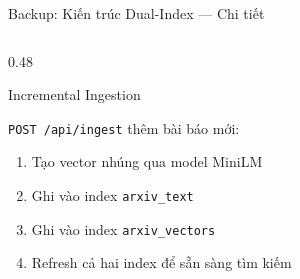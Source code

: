 \begin{frame}{Backup: Kiến trúc Dual-Index --- Chi tiết}
\begin{columns}[T]
\begin{column}{0.48\textwidth}
\vspace{-0.1cm}

\begin{block}{Incremental Ingestion}
{\scriptsize
\texttt{POST /api/ingest} thêm bài báo mới:
\begin{enumerate}\itemsep0pt \parskip0pt 
    \item Tạo vector nhúng qua model MiniLM
    \item Ghi vào index \texttt{arxiv\_text}
    \item Ghi vào index \texttt{arxiv\_vectors}
    \item Refresh cả hai index để sẵn sàng tìm kiếm
\end{enumerate}
}
\end{block}

\end{column}
\end{columns}
\end{frame}
